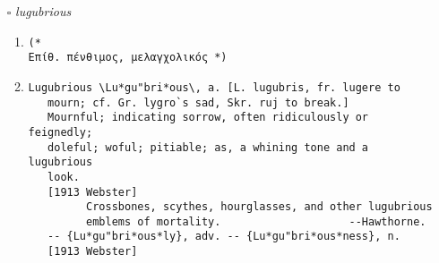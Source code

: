 \documentclass{article}
\begin{document}
\begin{itemize}
\begin{enumerate}
\item{
\begin{lstlisting}
(* 
Επίθ. δύσθυμος, σκυθρωπός, κακότροπος *)
\end{lstlisting}}
\item{
\begin{lstlisting}
Morose \Mo*rose"\ (m[-o]*r[=o]s"), a. [L. morosus, prop.,
   excessively addicted to any particular way or habit, fr. mos,
   moris, manner, habit, way of life: cf. F. morose.]
   1. Of a sour temper; sullen and austere; ill-humored; severe.
      ``A morose and affected taciturnity.'' --I. Watts.
      [1913 Webster]
   2. Lascivious; brooding over evil thoughts. [Obs.]
      [1913 Webster]
   Syn: Sullen; gruff; severe; austere; gloomy; crabbed; crusty;
        churlish; surly; ill-humored.
        [1913 Webster]
\end{lstlisting}}
\end{enumerate}
\item[$\square$] \emph{ lugubrious }
\begin{enumerate}
\item{
\begin{lstlisting}
(* 
Επίθ. πένθιμος, μελαγχολικός *)
\end{lstlisting}}
\item{
\begin{lstlisting}
Lugubrious \Lu*gu"bri*ous\, a. [L. lugubris, fr. lugere to
   mourn; cf. Gr. lygro`s sad, Skr. ruj to break.]
   Mournful; indicating sorrow, often ridiculously or feignedly;
   doleful; woful; pitiable; as, a whining tone and a lugubrious
   look.
   [1913 Webster]
         Crossbones, scythes, hourglasses, and other lugubrious
         emblems of mortality.                    --Hawthorne.
   -- {Lu*gu"bri*ous*ly}, adv. -- {Lu*gu"bri*ous*ness}, n.
   [1913 Webster]
\end{lstlisting}}
\end{enumerate}


\end{itemize}
\end{document}
